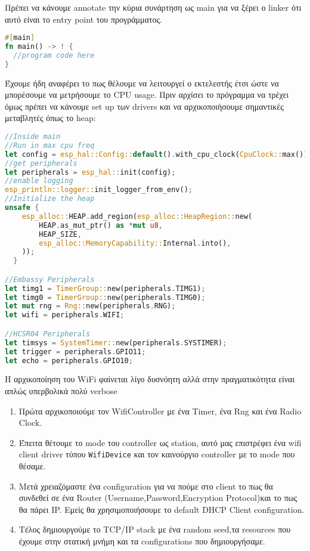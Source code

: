 Πρέπει να κάνουμε annotate την κύρια συνάρτηση ως main για να ξέρει
ο linker ότι αυτό είναι το entry point του προγράμματος.

\begin{lstlisting}[language=Rust]
#[main]
fn main() -> ! {
  //program code here
}
\end{lstlisting}

Έχουμε ήδη αναφέρει το πως θέλουμε να λειτουργεί ο εκτελεστής έτσι
ώστε να μπορέσουμε να μετρήσουμε το CPU usage. Πριν αρχίσει το
πρόγραμμα να τρέχει όμως πρέπει να κάνουμε set up των drivers και
να αρχικοποιήσουμε σημαντικές μεταβλητές όπως το heap:

\begin{lstlisting}[language=Rust]
//Inside main
//Run in max cpu freq
let config = esp_hal::Config::default().with_cpu_clock(CpuClock::max());
//get peripherals
let peripherals = esp_hal::init(config);
//enable logging
esp_println::logger::init_logger_from_env();
//Initialize the heap
unsafe {
    esp_alloc::HEAP.add_region(esp_alloc::HeapRegion::new(
        HEAP.as_mut_ptr() as *mut u8,
        HEAP_SIZE,
        esp_alloc::MemoryCapability::Internal.into(),
    ));
  }

//Embassy Peripherals
let timg1 = TimerGroup::new(peripherals.TIMG1);
let timg0 = TimerGroup::new(peripherals.TIMG0);
let mut rng = Rng::new(peripherals.RNG);
let wifi = peripherals.WIFI;

//HCSR04 Peripherals
let timsys = SystemTimer::new(peripherals.SYSTIMER);
let trigger = peripherals.GPIO11;
let echo = peripherals.GPIO10;
\end{lstlisting}

Η αρχικοποίηση του WiFi φαίνεται λίγο δυσνόητη αλλά
στην πραγματικότητα είναι απλώς υπερβολικά πολύ verbose

\begin{enumerate}
\item Πρώτα αρχικοποιούμε τον WifiController με ένα
  Timer, ένα Rng και ένα Radio Clock.
\item Έπειτα θέτουμε το mode του controller ως station, αυτό
  μας επιστρέφει ένα wifi client driver τύπου \verb|WifiDevice|
  και τον καινούργιο controller με το mode που θέσαμε.
\item Μετά χρειαζόμαστε ένα configuration για να πούμε στο client το
πως θα συνδεθεί σε ένα Router (Username,Password,Encryption
Protocol)και το πως θα πάρει IP. Εμείς θα χρησιμοποιήσουμε το default
DHCP Client configuration.
\item Τέλος δημιουργούμε το TCP/IP stack με ένα random seed,τα
  resources που έχουμε στην στατική μνήμη και τα configurations που
  δημιουργήσαμε. 
\end{enumerate}

